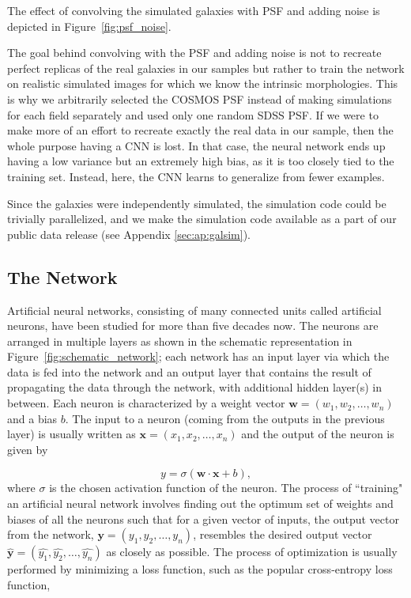 \documentclass[twocolumn]{aastex63}
\begin{document}
The effect of convolving the simulated galaxies with PSF and adding noise is depicted in Figure~\ref{fig:psf_noise}.

The goal behind convolving with the PSF and adding noise is not to recreate perfect replicas of the real galaxies in our samples but rather to train the network on realistic simulated images for which we know the intrinsic morphologies. This is why we arbitrarily selected the COSMOS PSF instead of making simulations for each field separately and used only one random SDSS PSF. If we were to make more of an effort to recreate exactly the real data in our sample, then the whole purpose having a CNN is lost. In that case, the neural network ends up having a low variance but an extremely high bias, as it is too closely tied to the training set. Instead, here, the CNN learns to generalize from fewer examples.  

Since the galaxies were independently simulated, the simulation code could be trivially parallelized, and we make the simulation code available as a part of our public data release (see Appendix \ref{sec:ap:galsim}).


\subsection{The Network} \label{sec:network_description}
Artificial neural networks, consisting of many connected units called artificial neurons, have been studied for more than five decades now. The neurons are arranged in multiple layers as shown in the schematic representation in Figure~\ref{fig:schematic_network}; each network has an input layer via which the data is fed into the network and an output layer that contains the result of propagating the data through the network, with additional hidden layer(s) in between. Each neuron is characterized by a weight vector $\bm{w}=(w_1,w_2,\ldots,w_n)$ and a bias $b$. The input to a neuron (coming from the outputs in the previous layer) is usually written as $\bm{x}=(x_1,x_2,\ldots,x_n)$ and the output of the neuron is given by 

\begin{equation}
y = \sigma(\bm{w} \cdot \bm{x} + b) ,
\label{eq:neuron_output}
\end{equation}
where $\sigma$ is the chosen activation function of the neuron. The process of ``training" an artificial neural network involves finding out the optimum set of weights and biases of all the neurons such that for a given vector of inputs, the output vector from the network, $\bm{y} = (y_1,y_2,\ldots,y_n)$, resembles the desired output vector $\bm{\hat{y}}=(\hat{y_1},\hat{y_2},\ldots,\hat{y_n})$ as closely as possible. The process of optimization is usually performed by minimizing a loss function, such as the popular cross-entropy loss function,
\end{document}
